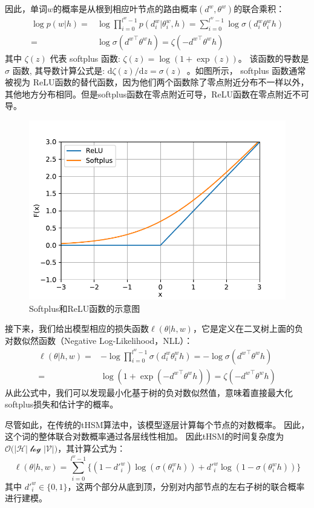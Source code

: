  因此，单词$ w $的概率是从根到相应叶节点的路由概率$(d^w,\theta^w)$的联合乘积：
\begin{equation}\label{equ:pw}
\begin{split}
 \log p(w|h)=&\log\prod_{i=0}^{l^w-1} p(d^w_i|\theta_{i}^w,h) = \sum_{i=0}^{l^w -1} \log\sigma(d_i^w \theta_{i}^w h)\\
 =&\log\sigma({d^w}^\top \theta^w h)=\zeta(- {d^w}^\top \theta^w h )
 \end{split}
\end{equation}
其中 $\zeta(z)$ 代表 softplus 函数: $\zeta(z)= \log (1+\exp(z))$。 该函数的导数是 $\sigma$ 函数, 其导数计算公式是: ${\mathrm{d}\zeta(z)}/{\mathrm{d} z}= \sigma(z)$~。如图所示， softplus 函数通常被视为 ReLU函数的替代函数，因为他们两个函数除了零点附近分布不一样以外，其他地方分布相同。但是softplus函数在零点附近可导，ReLU函数在零点附近不可导。
\begin{figure}[!ht]
  \centering
\includegraphics[width=0.6\linewidth]{./figures/relus.pdf}
\caption{Softplus和ReLU函数的示意图}\label{fig:soft}
\end{figure}

接下来，我们给出模型相应的损失函数$ \ell(\theta | h,w)$，它是定义在二叉树上面的负对数似然函数（Negative Log-Likelihood，NLL）：
\begin{equation}\label{equ:cost}
\begin{split}
   \ell(\theta|h,w) =&-\log\prod_{i=0}^{l^w -1} \sigma(d_i^w \theta_{i}^w h) = -\log \sigma({d^w}^\top \theta^w h)\\
    =& \log (1+\exp(- {d^w}^\top \theta^w h )) =  \zeta(- {d^w}^\top \theta^w h )
\end{split}
\end{equation}
从此公式中，我们可以发现最小化基于树的负对数似然值，意味着直接最大化softplus损失和估计字的概率。

尽管如此，在传统的tHSM算法中，该模型逐层计算每个节点的对数概率。 因此，这个词的整体联合对数概率通过各层线性相加。 因此tHSM的时间复杂度为$\mathcal{O(|H|\log|V|})$，其计算公式为：
\begin{equation}
\ell(\theta|h,w) =\sum_{i=0}^{l^w-1} \{(1-d'^w_i)\log (\sigma(\theta_{i}^w h))  + {d'^w_i}\log (1-\sigma (\theta_{i}^w h))\}
\end{equation}
其中 $d'^w_i\in \{0,1\}$，这两个部分从底到顶，分别对内部节点的左右子树的联合概率进行建模。

